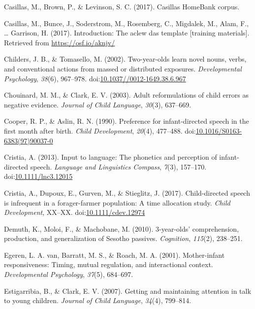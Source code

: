 \documentclass[floatsintext,man]{apa6}
\theoremstyle{definition}
\theoremstyle{definition}
\theoremstyle{definition}
\theoremstyle{remark}
\begin{document}
\hypertarget{ref-Casillas-HB}{}
Casillas, M., Brown, P., \& Levinson, S. C. (2017). Casillas HomeBank
corpus.

\hypertarget{ref-casillas2017ACLEWDAS}{}
Casillas, M., Bunce, J., Soderstrom, M., Rosemberg, C., Migdalek, M.,
Alam, F., \ldots{} Garrison, H. (2017). Introduction: The aclew das
template {[}training materials{]}. Retrieved from
\url{https://osf.io/aknjv/}

\hypertarget{ref-childers2002two}{}
Childers, J. B., \& Tomasello, M. (2002). Two-year-olds learn novel
nouns, verbs, and conventional actions from massed or distributed
exposures. \emph{Developmental Psychology}, \emph{38}(6), 967--978.
doi:\href{https://doi.org/10.1037//0012-1649.38.6.967}{10.1037//0012-1649.38.6.967}

\hypertarget{ref-chouinard2003adult}{}
Chouinard, M. M., \& Clark, E. V. (2003). Adult reformulations of child
errors as negative evidence. \emph{Journal of Child Language},
\emph{30}(3), 637--669.

\hypertarget{ref-cooper1990preference}{}
Cooper, R. P., \& Aslin, R. N. (1990). Preference for infant-directed
speech in the first month after birth. \emph{Child Development},
\emph{20}(4), 477--488.
doi:\href{https://doi.org/10.1016/S0163-6383(97)90037-0}{10.1016/S0163-6383(97)90037-0}

\hypertarget{ref-cristia2013input}{}
Cristia, A. (2013). Input to language: The phonetics and perception of
infant-directed speech. \emph{Language and Linguistics Compass},
\emph{7}(3), 157--170.
doi:\href{https://doi.org/10.1111/lnc3.12015}{10.1111/lnc3.12015}

\hypertarget{ref-cristia2017child}{}
Cristia, A., Dupoux, E., Gurven, M., \& Stieglitz, J. (2017).
Child-directed speech is infrequent in a forager-farmer population: A
time allocation study. \emph{Child Development}, XX--XX.
doi:\href{https://doi.org/10.1111/cdev.12974}{10.1111/cdev.12974}

\hypertarget{ref-demuth2010three}{}
Demuth, K., Moloi, F., \& Machobane, M. (2010). 3-year-olds'
comprehension, production, and generalization of Sesotho passives.
\emph{Cognition}, \emph{115}(2), 238--251.

\hypertarget{ref-vanegeren2001mother}{}
Egeren, L. A. van, Barratt, M. S., \& Roach, M. A. (2001). Mother-infant
responsiveness: Timing, mutual regulation, and interactional context.
\emph{Developmental Psychology}, \emph{37}(5), 684--697.

\hypertarget{ref-estigarribia2007getting}{}
Estigarribia, B., \& Clark, E. V. (2007). Getting and maintaining
attention in talk to young children. \emph{Journal of Child Language},
\emph{34}(4), 799--814.
\end{document}
